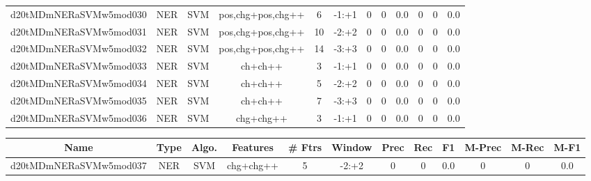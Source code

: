\documentclass[a4paper]{article}
\begin{document}
\begin{landscape}
\begin{center}
\begin{tabular}{ |c|c|c|c|c|c|c|c|c|c|c|c|}
 
 	
 	\small{ d20tMDmNERaSVMw5mod030 } & \small{ NER} & \small{  SVM }  & pos,chg+pos,chg++  &  6 &  \small{  -1:+1 }  &  0 & 0 & 0.0  &  0 & 0 & 0.0 \\
 	

 
 	
 	\small{ d20tMDmNERaSVMw5mod031 } & \small{ NER} & \small{  SVM }  & pos,chg+pos,chg++  &  10 &  \small{  -2:+2 }  &  0 & 0 & 0.0  &  0 & 0 & 0.0 \\
 	

 
 	
 	\small{ d20tMDmNERaSVMw5mod032 } & \small{ NER} & \small{  SVM }  & pos,chg+pos,chg++  &  14 &  \small{  -3:+3 }  &  0 & 0 & 0.0  &  0 & 0 & 0.0 \\
 	

 
 	
 	\small{ d20tMDmNERaSVMw5mod033 } & \small{ NER} & \small{  SVM }  & ch+ch++  &  3 &  \small{  -1:+1 }  &  0 & 0 & 0.0  &  0 & 0 & 0.0 \\
 	

 
 	
 	\small{ d20tMDmNERaSVMw5mod034 } & \small{ NER} & \small{  SVM }  & ch+ch++  &  5 &  \small{  -2:+2 }  &  0 & 0 & 0.0  &  0 & 0 & 0.0 \\
 	

 
 	
 	\small{ d20tMDmNERaSVMw5mod035 } & \small{ NER} & \small{  SVM }  & ch+ch++  &  7 &  \small{  -3:+3 }  &  0 & 0 & 0.0  &  0 & 0 & 0.0 \\
 	

 
 	
 	\small{ d20tMDmNERaSVMw5mod036 } & \small{ NER} & \small{  SVM }  & chg+chg++  &  3 &  \small{  -1:+1 }  &  0 & 0 & 0.0  &  0 & 0 & 0.0 \\
 	
 \hline
\end{tabular}
\end{center}




\begin{center}
\begin{tabular}{ |c|c|c|c|c|c|c|c|c|c|c|c|} 
 \hline
 	Name & Type & Algo. & Features & \# Ftrs & Window & Prec & Rec & F1 & M-Prec & M-Rec & M-F1\\
 \hline

 	

 
 	
 	\small{ d20tMDmNERaSVMw5mod037 } & \small{ NER} & \small{  SVM }  & chg+chg++  &  5 &  \small{  -2:+2 }  &  0 & 0 & 0.0  &  0 & 0 & 0.0 \\
 	


\end{tabular}
\end{center}
\end{landscape}
\end{document}
